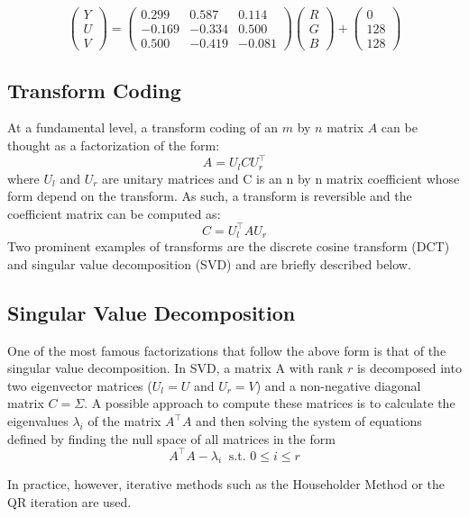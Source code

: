 \documentclass[review,onefignum,onetabnum]{siamart190516}
\begin{document}
\[
  \begin{pmatrix} Y \\ U \\ V \end{pmatrix} = 
  \begin{pmatrix}
    0.299 & 0.587 & 0.114 \\
    -0.169 & -0.334 & 0.500 \\
    0.500 & -0.419 & -0.081
  \end{pmatrix}
  \begin{pmatrix} R \\ G \\ B \end{pmatrix} + 
  \begin{pmatrix} 0 \\ 128 \\ 128 \end{pmatrix}
\]

\subsection{Transform Coding}
At a fundamental level, a transform coding of an $m$ by $n$ matrix $A$ can be thought
as a factorization of the form:
 \[
   A = U_l C U_r^\top
 \]
 where $U_l$ and $U_r$ are unitary matrices and C is an n by n matrix coefficient
 whose form depend on the transform. As such, a transform is reversible and the
 coefficient matrix can be computed as:
 \[
   C = U_l^\top A U_r
 \]
 Two prominent examples of transforms are the discrete cosine transform (DCT) and
 singular value decomposition (SVD) and are briefly described below. \cite{dapena2002hybrid}

\subsection{Singular Value Decomposition}
One of the most famous factorizations that follow the above form is that of the
singular value decomposition. In SVD, a matrix A with rank $r$ is decomposed into 
two eigenvector matrices ($U_l = U$ and $U_r = V$) and a non-negative diagonal
matrix $C = \Sigma$. A possible approach to compute these matrices is to calculate
the eigenvalues $\lambda_i$ of the matrix $A^\top A$ and then solving the system
of equations defined by finding the null space of all matrices in the form
\[
  A^\top A - \lambda_i~\text{ s.t. } 0 \leq i \leq r
\]

In practice, however, iterative methods such as the Householder Method or the QR 
iteration are used.\cite{trefethen1997numerical}
\end{document}
